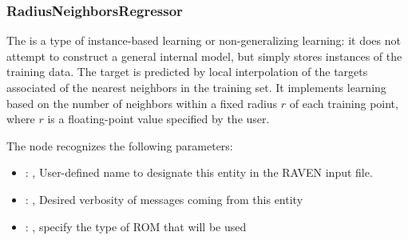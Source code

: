 \subsubsection{RadiusNeighborsRegressor}
  The  is a type of instance-based learning or
  non-generalizing learning: it does not attempt to construct a general internal
  model, but simply stores instances of the training data.                          The target is
  predicted by local interpolation of the targets associated of the                          nearest
  neighbors in the training set.                          It implements learning based on the number
  of neighbors within a fixed radius                          $r$ of each training point, where $r$
  is a floating-point value specified by the                          user.

  The  node recognizes the following parameters:
    \begin{itemize}
      \item {}: , 
        User-defined name to designate this entity in the RAVEN input file.
      \item {}: , 
        Desired verbosity of messages coming from this entity
      \item {}: , 
        specify the type of ROM that will be used
  \end{itemize}

